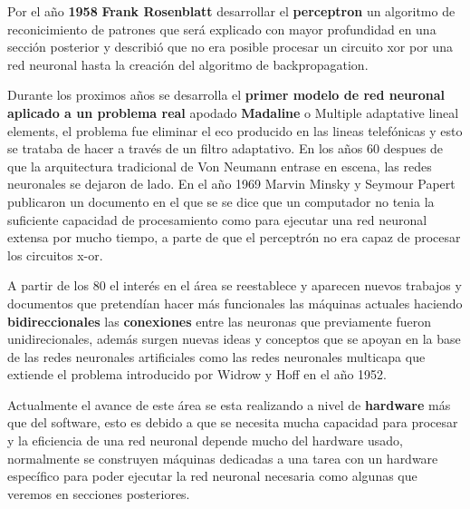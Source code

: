 \documentclass[a4paper, 11pt]{article} %
\begin{document}
Por el año \textbf{1958} \textbf{Frank Rosenblatt} desarrollar el \textbf{perceptron} un algoritmo de reconicimiento de patrones que será explicado con mayor profundidad en una sección posterior y describió que no era posible procesar un circuito xor por una red neuronal hasta la creación del algoritmo de backpropagation.

Durante los proximos años se desarrolla el \textbf{primer modelo de red neuronal aplicado a un problema real} apodado \textbf{Madaline} o Multiple adaptative lineal elements, el problema fue eliminar el eco producido en las lineas telefónicas y esto se trataba de hacer a través de un filtro adaptativo. En los años 60 despues de que la arquitectura tradicional de Von Neumann entrase en escena, las redes neuronales se dejaron de lado. En el año 1969 Marvin Minsky y Seymour Papert publicaron un documento en el que se se dice que un computador no tenia la suficiente capacidad de procesamiento como para ejecutar una red neuronal extensa por mucho tiempo, a parte de que el perceptrón no era capaz de procesar los circuitos x-or.

A partir de los 80 el interés en el área se reestablece y aparecen nuevos trabajos y documentos que pretendían hacer más funcionales las máquinas actuales haciendo \textbf{bidireccionales} las \textbf{conexiones} entre las neuronas que previamente fueron unidirecionales, además surgen nuevas ideas y conceptos que se apoyan en la base de las redes neuronales artificiales como las redes neuronales multicapa que extiende el problema introducido por Widrow y Hoff en el año 1952. 

Actualmente el avance de este área se esta realizando a nivel de \textbf{hardware} más que del software, esto es debido a que se necesita mucha capacidad para procesar y la eficiencia de una red neuronal depende mucho del hardware usado, normalmente se construyen máquinas dedicadas a una tarea con un hardware específico para poder ejecutar la red neuronal necesaria como algunas que veremos en secciones posteriores.
\end{document}
